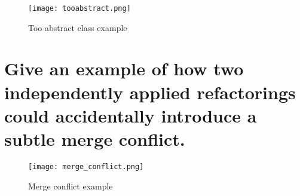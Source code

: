 \begin{figure}[!ht]
\centering
\texttt{[image: tooabstract.png]}
\caption{Too abstract class example}
\end{figure}
\FloatBarrier{}

\section{Give an example of how two independently applied refactorings could accidentally introduce a
subtle merge conflict.}

\begin{figure}[!ht]
\centering
\texttt{[image: merge\_conflict.png]}
\caption{Merge conflict example}
\end{figure}
\FloatBarrier{}

